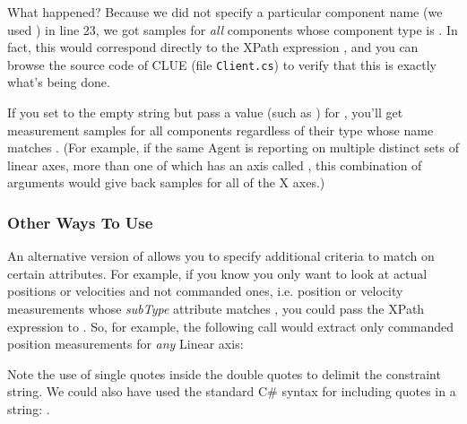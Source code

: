 What happened? Because we did not specify a particular component name
(we used ) in line 23, we got samples for \emph{all}
components whose component type is .  In fact, this would
correspond directly to the XPath expression 
, and you can browse the
source code of CLUE (file \texttt{Client.cs}) to
verify that this is exactly what's being done.


If you set  to the empty string but pass a value (such as
) for , you'll get measurement samples for all
components regardless of their type whose name matches .
(For example, if the same Agent is reporting on multiple distinct sets
of linear axes, more than one of which has an axis called ,
this combination of arguments would give back samples for all of the X
axes.)


\subsubsection{Other Ways To Use }

An alternative version of  allows
you to specify additional criteria to match on certain attributes.  For
example, if you know you only want to look at actual positions or
velocities and not commanded ones, i.e. position or velocity
measurements whose \emph{subType} attribute matches , you
could pass the XPath expression
\icode{//[@subType="ACTUAL"]}
to .
So, for example, the following call would extract only commanded position
measurements for \emph{any} Linear axis:

\begin{quotation}
\end{quotation}

Note the use of single quotes inside the double quotes to delimit the
constraint string.  We could also have used the standard C\# syntax for
including quotes in a string:
.

